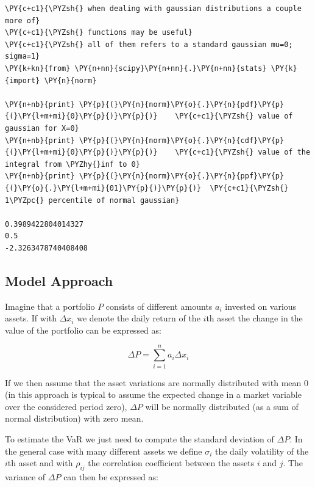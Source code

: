     \begin{tcolorbox}[breakable, size=fbox, boxrule=1pt, pad at break*=1mm,colback=cellbackground, colframe=cellborder]
\begin{Verbatim}[commandchars=\\\{\}]
\PY{c+c1}{\PYZsh{} when dealing with gaussian distributions a couple more of}
\PY{c+c1}{\PYZsh{} functions may be useful}
\PY{c+c1}{\PYZsh{} all of them refers to a standard gaussian mu=0; sigma=1}
\PY{k+kn}{from} \PY{n+nn}{scipy}\PY{n+nn}{.}\PY{n+nn}{stats} \PY{k}{import} \PY{n}{norm}

\PY{n+nb}{print} \PY{p}{(}\PY{n}{norm}\PY{o}{.}\PY{n}{pdf}\PY{p}{(}\PY{l+m+mi}{0}\PY{p}{)}\PY{p}{)}    \PY{c+c1}{\PYZsh{} value of gaussian for X=0}
\PY{n+nb}{print} \PY{p}{(}\PY{n}{norm}\PY{o}{.}\PY{n}{cdf}\PY{p}{(}\PY{l+m+mi}{0}\PY{p}{)}\PY{p}{)}    \PY{c+c1}{\PYZsh{} value of the integral from \PYZhy{}inf to 0}
\PY{n+nb}{print} \PY{p}{(}\PY{n}{norm}\PY{o}{.}\PY{n}{ppf}\PY{p}{(}\PY{o}{.}\PY{l+m+mi}{01}\PY{p}{)}\PY{p}{)}  \PY{c+c1}{\PYZsh{} 1\PYZpc{} percentile of normal gaussian}

0.3989422804014327
0.5
-2.3263478740408408
    \end{Verbatim}
    \end{tcolorbox}

\subsection{Model Approach}\label{model-approach}

Imagine that a portfolio \(P\) consists of different amounts \(a_i\)
invested on various assets. If with \(\Delta x_i\) we denote the daily
return of the $i$th asset the change in the value of the portfolio can be
expressed as:

\[\Delta P = \sum_{i=1}^n a_i \Delta x_i\]

If we then assume that the asset variations are normally distributed
with mean 0 (in this approach is typical to assume the expected change
in a market variable over the considered period zero), \(\Delta P\) will
be normally distributed (as a sum of normal distribution) with zero
mean.

To estimate the VaR we just need to compute the standard deviation of
\(\Delta P\). In the general case with many different assets we define
\(\sigma_i\) the daily volatility of the $i$th asset and with
\(\rho_{ij}\) the correlation coefficient between the assets $i$ and $j$.
The variance of \(\Delta P\) can then be expressed as:

